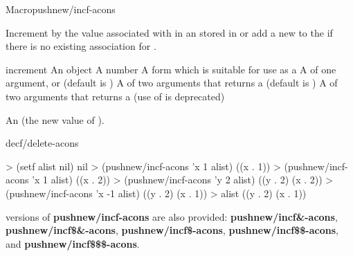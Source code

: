 \documentclass[10pt,twoside,english,pdftex]{article}
\begin{document}
\begin{functiondoc}{Macro}{pushnew/incf-acons}{
     
    \returns{} }
%
%
%
%
  
\fnsyntax

\fnpurpose Increment by  the value associated with
 in an  stored in  or
add a new   to the
 if there is no existing association for
.

\fnpackage {}

\fnmodule {}

\fnargs
\begin{args}{increment}
\arg[item] An object
\arg[increment] A number
\arg[place] A form which is suitable for use as a
\arg[key] A  of one argument, or \nil{} (default is \nil)
\arg[test] A  of two arguments that returns a
 (default is ) 
 A  of two arguments that returns a
 (use of  is deprecated)
\end{args}

\fnreturns An  (the new value of ). 

\begin{alsos}{decf/delete-acons}
\end{alsos}

\fnexamples
%
\W\supp
\begin{example}
> (setf alist nil)
nil
> (pushnew/incf-acons 'x 1 alist)
((x . 1))
> (pushnew/incf-acons 'x 1 alist)
((x . 2))\goodpagebreak
> (pushnew/incf-acons 'y 2 alist)
((y . 2) (x . 2))
> (pushnew/incf-acons 'x -1 alist)
((y . 2) (x . 1))
> alist
((y . 2) (x . 1))
\end{example}

\fnnote
%
%
%
%
%
%
%
 versions of
\textbf{pushnew/incf-acons} are also provided: \textbf{pushnew/incf\&-acons},
\textbf{pushnew/incf\$\&-acons}, \textbf{pushnew/incf\$-acons},
\textbf{pushnew/incf\$\$-acons}, and \textbf{pushnew/incf\$\$\$-acons}.

\end{functiondoc}
\end{document}
